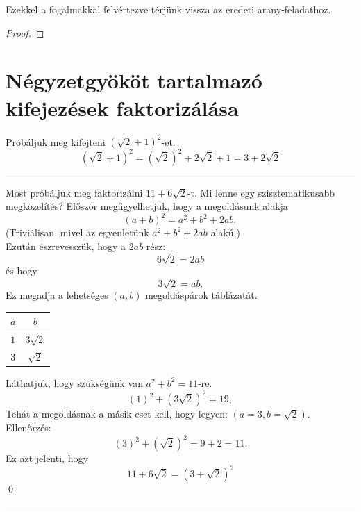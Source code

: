 \documentclass{article}
\begin{document}

Ezekkel a fogalmakkal felvértezve térjünk vissza az eredeti arany-feladathoz.

\begin{proof}
\end{proof}

\section{Négyzetgyököt tartalmazó kifejezések faktorizálása}
Próbáljuk meg kifejteni $(\sqrt{2} + 1)^2$-et.
\[
    (\sqrt{2}+1)^2 = (\sqrt{2})^2 + 2\sqrt{2} + 1 = 3 + 2\sqrt{2}
\]

\hrule
\vspace{10pt}

Most próbáljuk meg faktorizálni $11 + 6\sqrt{2}$-t.
Mi lenne egy szisztematikusabb megközelítés?
Először megfigyelhetjük, hogy a megoldásunk alakja
\[
    (a+b)^2 = a^2 + b^2 + 2ab,
\]
(Triviálisan, mivel az egyenletünk $a^2 + b^2 + 2ab$ alakú.)\\
Ezután észrevesszük, hogy a $2ab$ rész:
\[
    6\sqrt{2} = 2ab
\]
és hogy
\[
    3\sqrt{2} = ab.
\]
Ez megadja a lehetséges $(a, b)$ megoldáspárok táblázatát.
\begin{center}
    \begin{tabular}{c|c}
        $a$ & $b$ \\
        \hline
        \rule{0pt}{3ex} 
        $1$ & $3\sqrt{2}$ \\ 
        $3$ & $\sqrt{2}$ \\ 
    \end{tabular}
\end{center}
Láthatjuk, hogy szükségünk van $a^2 + b^2 = 11$-re.\\
\[
    (1)^2 + (3\sqrt{2})^2 = 19,
\]
Tehát a megoldásnak a másik eset kell, hogy legyen: $(a = 3, b = \sqrt{2}).$ Ellenőrzés:
\[
    (3)^2 + (\sqrt{2})^2 = 9 + 2 = 11.
\]
Ez azt jelenti, hogy
\[
    11 + 6\sqrt{2} = (3 + \sqrt{2})^2
\] \qed

\vspace{10pt}
\hrule
\vspace{10pt}
\end{document}
